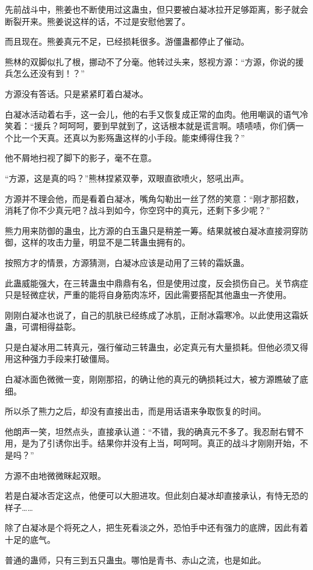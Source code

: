 \begin{this_body}
先前战斗中，熊姜也不断使用过这蛊虫，但只要被白凝冰拉开足够距离，影子就会断裂开来。熊姜说这样的话，不过是安慰他罢了。

而且现在。熊姜真元不足，已经损耗很多。游僵蛊都停止了催动。

熊林的双脚似扎了根，挪动不了分毫。他转过头来，怒视方源：“方源，你说的援兵怎么还没有到！？”

方源没有答话。只是紧紧盯着白凝冰。

白凝冰活动着右手，这一会儿，他的右手又恢复成正常的血肉。他用嘲讽的语气冷笑着：“援兵？呵呵呵，要到早就到了，这话根本就是谎言啊。啧啧啧，你们俩一个比一个天真。还真以为影殇蛊这样的小手段。能束缚得住我？”

他不屑地扫视了脚下的影子，毫不在意。

“方源，这是真的吗？”熊林捏紧双拳，双眼直欲喷火，怒吼出声。

方源并不理会他，而是看着白凝冰，嘴角勾勒出一丝了然的笑意：“刚才那招数，消耗了你不少真元吧？战斗到如今，你空窍中的真元，还剩下多少呢？”

熊力用来防御的蛊虫，比方源的白玉蛊只是稍差一筹。结果就被白凝冰直接洞穿防御，这样的攻击力量，明显不是二转蛊虫拥有的。

按照方才的情景，方源猜测，白凝冰应该是动用了三转的霜妖蛊。

此蛊威能强大，在三转蛊虫中鼎鼎有名，但是使用过度，反会损伤自己。关节病症只是轻微症状，严重的能将自身筋肉冻坏，因此需要搭配其他蛊虫一齐使用。

刚刚白凝冰也说了，自己的肌肤已经练成了冰肌，正耐冰霜寒冷。以此使用这霜妖蛊，可谓相得益彰。

只是白凝冰用二转真元，强行催动三转蛊虫，必定真元有大量损耗。但他必须又得用这种强力手段来打破僵局。

白凝冰面色微微一变，刚刚那招，的确让他的真元的确损耗过大，被方源瞧破了底细。

所以杀了熊力之后，却没有直接出击，而是用话语来争取恢复的时间。

他朗声一笑，坦然点头，直接承认道：“不错，我的确真元不多了。我忍耐右臂不用，是为了引诱你出手。结果你并没有上当，呵呵呵。真正的战斗才刚刚开始，不是吗？”

方源不由地微微眯起双眼。

若是白凝冰否定这点，他便可以大胆进攻。但此刻白凝冰却直接承认，有恃无恐的样子……

除了白凝冰是个将死之人，把生死看淡之外，恐怕手中还有强力的底牌，因此有着十足的底气。

普通的蛊师，只有三到五只蛊虫。哪怕是青书、赤山之流，也是如此。


\end{this_body}
